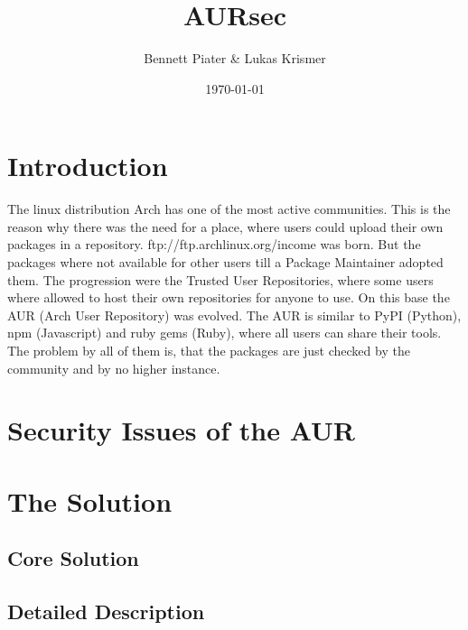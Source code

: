 \documentclass{scrartcl}
\title{AURsec}
\author{Bennett Piater \& Lukas Krismer}
\date{\today}
\begin{document}
  \thispagestyle{empty}

  


  \begin{abstract}
  \end{abstract}

  \tableofcontents
  \listoffigures
  \listoftables
  \pagebreak


  \section{Introduction}  %
  The linux distribution Arch has one of the most active communities. This is the reason why there was the need for a place, where users could upload their own packages in a repository.
  ftp://ftp.archlinux.org/income was born. But the packages where not available for other users till a Package Maintainer adopted them.
  The progression were the Trusted User Repositories, where some users where allowed to host their own repositories for anyone to use. On this base the AUR (Arch User Repository) was evolved. The AUR is similar to PyPI (Python), npm (Javascript) and ruby gems (Ruby), where all users can share their tools. The problem by all of them is, that the packages are just checked by the community and by no higher instance. \cite{wiki:AUR} 

  \section{Security Issues of the AUR} %

  \section{The Solution} %
    \subsection{Core Solution}  %
    \subsection{Detailed Description} %
    
\end{document}
